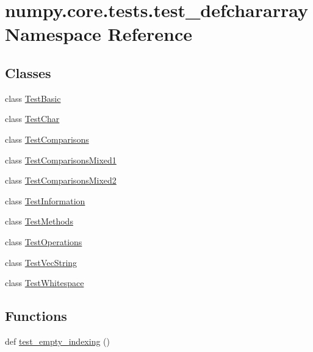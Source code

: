 \hypertarget{namespacenumpy_1_1core_1_1tests_1_1test__defchararray}{}\section{numpy.\+core.\+tests.\+test\+\_\+defchararray Namespace Reference}
\label{namespacenumpy_1_1core_1_1tests_1_1test__defchararray}
\subsection*{Classes}
\begin{DoxyCompactItemize}
\item 
class \hyperlink{classnumpy_1_1core_1_1tests_1_1test__defchararray_1_1TestBasic}{Test\+Basic}
\item 
class \hyperlink{classnumpy_1_1core_1_1tests_1_1test__defchararray_1_1TestChar}{Test\+Char}
\item 
class \hyperlink{classnumpy_1_1core_1_1tests_1_1test__defchararray_1_1TestComparisons}{Test\+Comparisons}
\item 
class \hyperlink{classnumpy_1_1core_1_1tests_1_1test__defchararray_1_1TestComparisonsMixed1}{Test\+Comparisons\+Mixed1}
\item 
class \hyperlink{classnumpy_1_1core_1_1tests_1_1test__defchararray_1_1TestComparisonsMixed2}{Test\+Comparisons\+Mixed2}
\item 
class \hyperlink{classnumpy_1_1core_1_1tests_1_1test__defchararray_1_1TestInformation}{Test\+Information}
\item 
class \hyperlink{classnumpy_1_1core_1_1tests_1_1test__defchararray_1_1TestMethods}{Test\+Methods}
\item 
class \hyperlink{classnumpy_1_1core_1_1tests_1_1test__defchararray_1_1TestOperations}{Test\+Operations}
\item 
class \hyperlink{classnumpy_1_1core_1_1tests_1_1test__defchararray_1_1TestVecString}{Test\+Vec\+String}
\item 
class \hyperlink{classnumpy_1_1core_1_1tests_1_1test__defchararray_1_1TestWhitespace}{Test\+Whitespace}
\end{DoxyCompactItemize}
\subsection*{Functions}
\begin{DoxyCompactItemize}
\item 
def \hyperlink{namespacenumpy_1_1core_1_1tests_1_1test__defchararray_aef06084c212dbbc444948a546b35f61b}{test\+\_\+empty\+\_\+indexing} ()
\end{DoxyCompactItemize}
